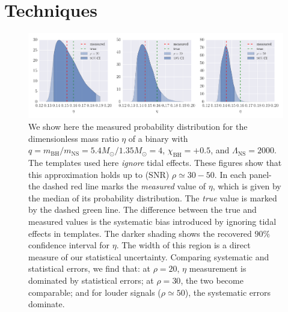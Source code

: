 \documentclass[aps,prd,amsmath,floats,floatfix, twocolumn,
superscriptaddress,nofootinbib,showpacs]{revtex4-1}
\newcommand{\lambdans}{\Lambda_\mathrm{NS}}
\newcommand{\chibh}{\chi_\mathrm{BH}}
\newcommand{\mbh}{m_\mathrm{BH}}
\newcommand{\mns}{m_\mathrm{NS}}
\begin{document}
\section{Techniques}\label{s1:techniques}
\begin{figure}
\centering 
\includegraphics[width=1.8\columnwidth]{plots/SingleSystemEta_q4_0_mc2_25_chi0_50}
\caption{We show here the measured probability distribution for the
dimensionless mass ratio $\eta$ of a binary with
$q = \mbh/\mns = 5.4M_\odot/1.35M_\odot = 4$, $\chibh=+0.5$, and
$\lambdans=2000$. The templates used here {\it ignore} tidal effects.
These figures show that this approximation holds up to (SNR)
$\rho\simeq 30-50$.
% 
In each panel- the dashed red line marks the {\it measured} value of $\eta$,
which is given by the median of its probability distribution.
The {\it true} value is marked by the dashed green line. The difference
between the true and measured values is the systematic bias introduced
by ignoring tidal effects in templates. The darker shading shows
the recovered $90\%$ confidence interval for $\eta$. The width of this
region is a direct measure of our statistical uncertainty.
% 
Comparing systematic and statistical errors, we find that:
at $\rho=20$, $\eta$ measurement is dominated by statistical
errors; at $\rho=30$, the two become comparable; and 
for louder signals ($\rho\simeq50$), the systematic errors dominate.
}
\label{fig:SingleSystemEtaPDFvsSNR}
\end{figure}
\end{document}
